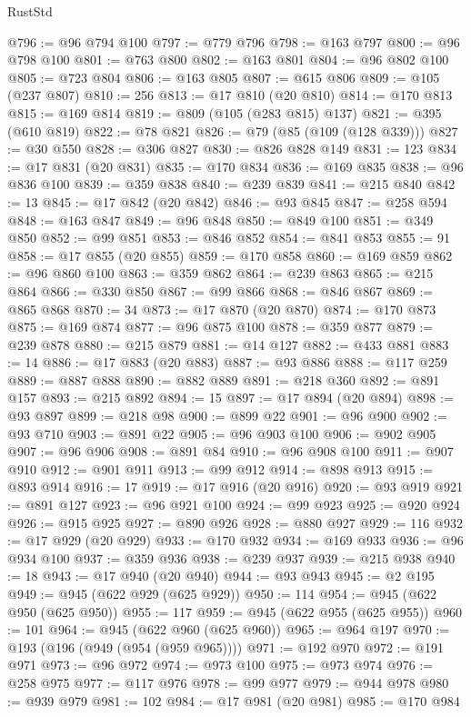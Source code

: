 \begin{lexlean}{RustStd}
\begin{coremodule}
@796 := @96 @794 @100
@797 := @779 @796
@798 := @163 @797
@800 := @96 @798 @100
@801 := @763 @800
@802 := @163 @801
@804 := @96 @802 @100
@805 := @723 @804
@806 := @163 @805
@807 := @615 @806
@809 := @105 (@237 @807)
@810 := 256
@813 := @17 @810 (@20 @810)
@814 := @170 @813
@815 := @169 @814
@819 := @809 (@105 (@283 @815) @137)
@821 := @395 (@610 @819)
@822 := @78 @821
@826 := @79 (@85 (@109 (@128 @339)))
@827 := @30 @550
@828 := @306 @827
@830 := @826 @828 @149
@831 := 123
@834 := @17 @831 (@20 @831)
@835 := @170 @834
@836 := @169 @835
@838 := @96 @836 @100
@839 := @359 @838
@840 := @239 @839
@841 := @215 @840
@842 := 13
@845 := @17 @842 (@20 @842)
@846 := @93 @845
@847 := @258 @594
@848 := @163 @847
@849 := @96 @848
@850 := @849 @100
@851 := @349 @850
@852 := @99 @851
@853 := @846 @852
@854 := @841 @853
@855 := 91
@858 := @17 @855 (@20 @855)
@859 := @170 @858
@860 := @169 @859
@862 := @96 @860 @100
@863 := @359 @862
@864 := @239 @863
@865 := @215 @864
@866 := @330 @850
@867 := @99 @866
@868 := @846 @867
@869 := @865 @868
@870 := 34
@873 := @17 @870 (@20 @870)
@874 := @170 @873
@875 := @169 @874
@877 := @96 @875 @100
@878 := @359 @877
@879 := @239 @878
@880 := @215 @879
@881 := @14 @127
@882 := @433 @881
@883 := 14
@886 := @17 @883 (@20 @883)
@887 := @93 @886
@888 := @117 @259
@889 := @887 @888
@890 := @882 @889
@891 := @218 @360
@892 := @891 @157
@893 := @215 @892
@894 := 15
@897 := @17 @894 (@20 @894)
@898 := @93 @897
@899 := @218 @98
@900 := @899 @22
@901 := @96 @900
@902 := @93 @710
@903 := @891 @22
@905 := @96 @903 @100
@906 := @902 @905
@907 := @96 @906
@908 := @891 @84
@910 := @96 @908 @100
@911 := @907 @910
@912 := @901 @911
@913 := @99 @912
@914 := @898 @913
@915 := @893 @914
@916 := 17
@919 := @17 @916 (@20 @916)
@920 := @93 @919
@921 := @891 @127
@923 := @96 @921 @100
@924 := @99 @923
@925 := @920 @924
@926 := @915 @925
@927 := @890 @926
@928 := @880 @927
@929 := 116
@932 := @17 @929 (@20 @929)
@933 := @170 @932
@934 := @169 @933
@936 := @96 @934 @100
@937 := @359 @936
@938 := @239 @937
@939 := @215 @938
@940 := 18
@943 := @17 @940 (@20 @940)
@944 := @93 @943
@945 := @2 @195
@949 := @945 (@622 @929 (@625 @929))
@950 := 114
@954 := @945 (@622 @950 (@625 @950))
@955 := 117
@959 := @945 (@622 @955 (@625 @955))
@960 := 101
@964 := @945 (@622 @960 (@625 @960))
@965 := @964 @197
@970 := @193 (@196 (@949 (@954 (@959 @965))))
@971 := @192 @970
@972 := @191 @971
@973 := @96 @972
@974 := @973 @100
@975 := @973 @974
@976 := @258 @975
@977 := @117 @976
@978 := @99 @977
@979 := @944 @978
@980 := @939 @979
@981 := 102
@984 := @17 @981 (@20 @981)
@985 := @170 @984

\end{coremodule}
\end{lexlean}
